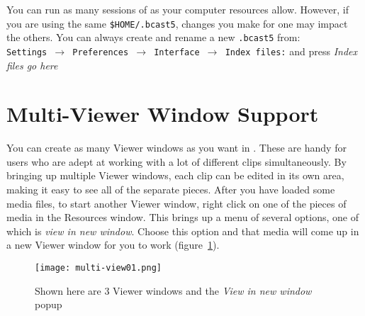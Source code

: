 You can run as many sessions of \CGG{} as your computer resources allow.  However, if you are using the same \texttt{\$HOME/.bcast5}, changes you make for one may impact the others. You can always create and rename a new \texttt{.bcast5} from:\\
\texttt{Settings $\rightarrow$ Preferences $\rightarrow$ Interface $\rightarrow$ Index files:} and press \textit{Index files go here}

\section{Multi-Viewer Window Support}%
\label{sec:multi_viewer_window_support}

You can create as many Viewer windows as you want in \CGG{}.  These are handy for users who are adept at working with a lot of different clips simultaneously.  By bringing up multiple Viewer windows, each clip can be edited in its own area, making it easy to see all of the separate pieces.  After you have loaded some media files, to start another Viewer window, right click on one of the pieces of media in the Resources window.  This brings up a menu of several options, one of which is \textit{view in new window}.  Choose this option and that media will come up in a new Viewer window for you to work (figure~\ref{fig:multi-view01}).

\begin{figure}[htpb]
    \centering
    \texttt{[image: multi-view01.png]}
    \caption{Shown here are 3 Viewer windows and the \textit{View in new window} popup}
    \label{fig:multi-view01}
\end{figure}

